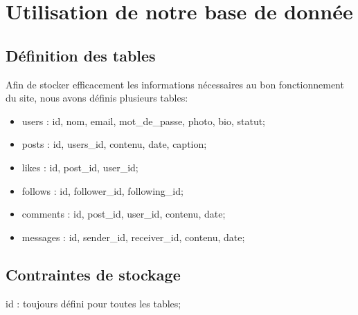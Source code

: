 \documentclass[12pt,a4paper]{article}
\begin{document}
\section{Utilisation de notre base de donnée}
\subsection{Définition des tables}
  Afin de stocker efficacement les informations nécessaires au bon fonctionnement du site, nous avons définis plusieurs tables:
  
 \begin{itemize}
 \item users : id, nom, email, mot\_de\_passe, photo, bio, statut;
 \item posts : id, users\_id, contenu, date, caption;
 \item likes : id, post\_id, user\_id;
 \item follows : id, follower\_id, following\_id;
 \item comments : id, post\_id, user\_id, contenu, date;
 \item messages : id, sender\_id, receiver\_id, contenu, date;
 \end{itemize}

\newpage

\subsection{Contraintes de stockage}

id : toujours défini pour toutes les tables;
\end{document}
